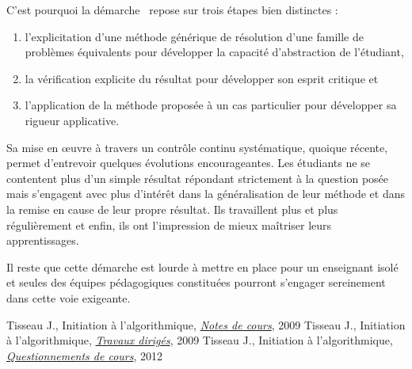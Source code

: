 \documentclass[11pt,a4paper,colorlinks,breaklinks]{article}
\begin{document}
C'est pourquoi la démarche \mvr\ repose sur trois étapes bien distinctes :
\begin{enumerate}
\item l'explicitation d'une méthode générique de résolution d'une famille de problèmes équivalents pour développer la capacité d'abstraction de l'étudiant,
\item la vérification explicite du résultat pour développer son esprit critique et 
\item l'application de la méthode proposée à un cas particulier pour développer sa rigueur applicative. 
\end{enumerate}

Sa mise en \oe uvre à travers un contrôle continu systématique, quoique récente, permet d'entrevoir quelques évolutions encourageantes. Les étudiants ne se contentent plus d'un simple résultat répondant strictement à la question posée mais s'engagent avec plus d'intérêt dans la généralisation de leur méthode et dans la remise en cause de leur propre résultat.
Ils travaillent plus et plus régulièrement et enfin, ils ont l'impression de mieux maîtriser leurs apprentissages.

Il reste que cette démarche est lourde à mettre en place pour un enseignant isolé et seules des équipes pédagogiques constituées pourront s'engager sereinement dans cette voie exigeante.

\begin{thebibliography}{99}
 Tisseau J., Initiation à l'algorithmique, \href{http://www.enib.fr/~tisseau/pdf/course/info-S1.pdf}{\emph{Notes de cours}}, \enib{} 2009
 Tisseau J., Initiation à l'algorithmique, \href{http://www.enib.fr/~tisseau/pdf/course/td-info-S1.pdf}{\emph{Travaux dirigés}}, \enib{} 2009
 Tisseau J., Initiation à l'algorithmique, \href{http://www.enib.fr/~tisseau/pdf/course/q-info-S1.pdf}{\emph{Questionnements de cours}}, \enib{} 2012
\end{thebibliography}
\end{document}
